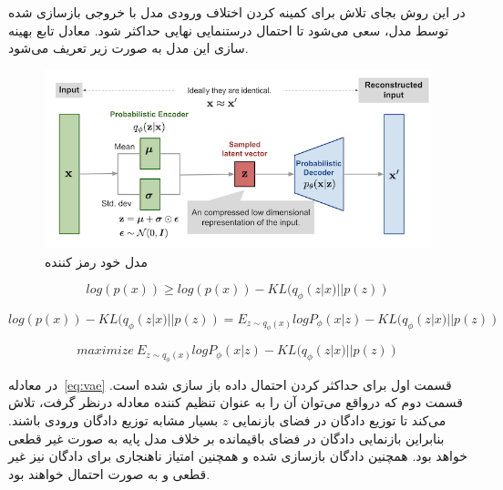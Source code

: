 \documentclass[12pt,a4paper]{report}
\theoremstyle{definition}
\theoremstyle{definition}
\begin{document}
در این روش بجای تلاش برای کمینه کردن اختلاف ورودی مدل با خروجی بازسازی شده توسط مدل، سعی می‌شود تا احتمال درستنمایی نهایی حداکثر شود. معادل تابع بهینه سازی این مدل به صورت زیر تعریف می‌شود.
\begin{figure}[!h]
	\begin{center}
		\includegraphics[width=0.7\linewidth]{./images/figures/vae.png}
	\end{center}
	\caption{مدل خود رمز کننده }
	\label{fig:vae}
	\centering
\end{figure}

\begin{equation}
log(p(x)) \ge log(p(x)) - KL(q_\phi(z|x) || p(z))
\end{equation}

\begin{equation}
log(p(x)) - KL(q_\phi(z|x) || p(z)) = E_{z \sim q_\phi(x)}logP_\phi(x|z)  -  KL(q_\phi(z|x) || p(z))
\end{equation}


\begin{equation}
maximize\  E_{z \sim q_\phi(x)}logP_\phi(x|z)  -  KL(q_\phi(z|x) || p(z))
\label{eq:vae}
\end{equation}

در معادله~\eqref{eq:vae} قسمت اول برای حداکثر کردن احتمال داده باز سازی شده است. قسمت دوم که درواقع می‌توان آن را به عنوان تنظیم کننده معادله درنظر گرفت، تلاش می‌کند تا توزیع دادگان در فضای بازنمایی $z$ بسیار مشابه توزیع دادگان ورودی باشند. بنابراین بازنمایی دادگان در فضای باقیمانده بر خلاف مدل پایه به صورت غیر قطعی خواهد بود. همچنین دادگان بازسازی شده و همچنین امتیاز ناهنجاری برای دادگان نیز غیر قطعی و به صورت احتمال خواهند بود. 
\end{document}
